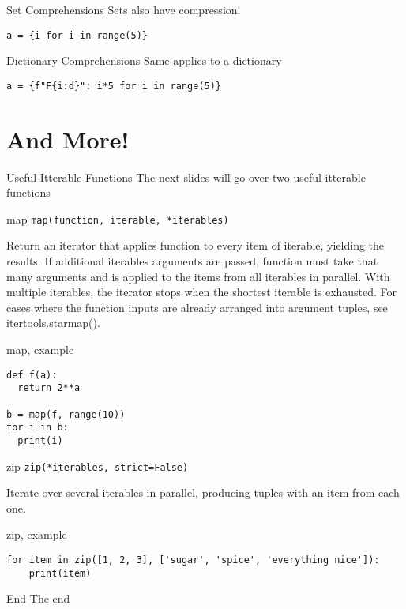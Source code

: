 \begin{frame}[containsverbatim]{Set Comprehensions}
  Sets also have compression!

\begin{verbatim}
a = {i for i in range(5)}
\end{verbatim}
\end{frame}

\begin{frame}[containsverbatim]{Dictionary Comprehensions}
  Same applies to a dictionary

\begin{verbatim}
a = {f"F{i:d}": i*5 for i in range(5)}
\end{verbatim}
\end{frame}

\section{And More!}

\begin{frame}{Useful Itterable Functions}
  The next slides will go over two useful itterable functions
\end{frame}

\begin{frame}[containsverbatim]{map}
\texttt{map(function, iterable, *iterables)}

Return an iterator that applies function to every item of iterable, yielding the results. If additional iterables arguments are passed, function must take that many arguments and is applied to the items from all iterables in parallel. With multiple iterables, the iterator stops when the shortest iterable is exhausted. For cases where the function inputs are already arranged into argument tuples, see itertools.starmap().
\end{frame}

\begin{frame}[containsverbatim]{map, example}
  \begin{verbatim}
def f(a):
  return 2**a

b = map(f, range(10))
for i in b:
  print(i)
  \end{verbatim}
\end{frame}

\begin{frame}[containsverbatim]{zip}
\texttt{zip(*iterables, strict=False)}

Iterate over several iterables in parallel, producing tuples with an item from each one.
\end{frame}

\begin{frame}[containsverbatim]{zip, example}
  \begin{verbatim}
for item in zip([1, 2, 3], ['sugar', 'spice', 'everything nice']):
    print(item)
  \end{verbatim}
\end{frame}

\begin{frame}[standout]{End}
  The end
\end{frame}


